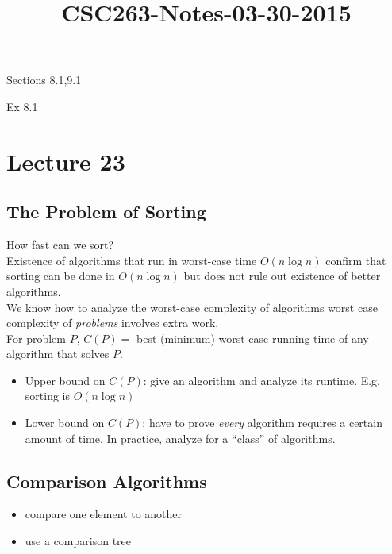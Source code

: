



\title{CSC263-Notes-03-30-2015}



\reversemarginpar

\mpreadings

\noindent Sections 8.1,9.1 \\

\mpselftest

\noindent Ex 8.1 

\section*{Lecture 23}

\subsection*{The Problem of Sorting}

\noindent How fast can we sort? \\

\noindent Existence of algorithms that run in worst-case time $O(n \log n)$
confirm that sorting can be done in $O(n \log n)$ but does not rule out
existence of better algorithms. \\

\noindent We know how to analyze the worst-case complexity of algorithms worst
case complexity of \textit{problems} involves extra work. \\

\noindent For problem $P$, $C(P) =$ best (minimum) worst case running time of
any algorithm that solves $P$. 

\begin{itemize}
	\item[] Upper bound on $C(P)$: give an algorithm and analyze its runtime.
	E.g. sorting is $O(n \log n)$
	\item[] Lower bound on $C(P)$: have to prove \textit{every} algorithm
	requires a certain amount of time. In practice, analyze for a ``class'' of
	algorithms. 
\end{itemize}

\subsection*{Comparison Algorithms}

\begin{itemize}
	\item compare one element to another
	\item use a comparison tree
\end{itemize}

